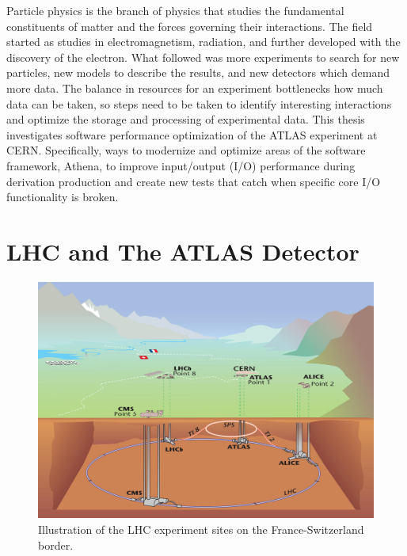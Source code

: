 Particle physics is the branch of physics that studies the fundamental constituents of matter and the forces governing their interactions.  
The field started as studies in electromagnetism, radiation, and further developed with the discovery of the electron.
What followed was more experiments to search for new particles, new models to describe the results, and new detectors which demand more data.
The balance in resources for an experiment bottlenecks how much data can be taken, so steps need to be taken to identify interesting interactions and optimize the storage and processing of experimental data.
This thesis investigates software performance optimization of the ATLAS experiment at CERN. 
Specifically, ways to modernize and optimize areas of the software framework, Athena, to improve input/output (I/O) performance during derivation production and create new tests that catch when specific core I/O functionality is broken.

\section{LHC and The ATLAS Detector}


\begin{figure}[h]
    \centering
    \vspace{20px}
    \includegraphics[width=.8\textwidth]{content/img/LHC illustration.jpg}
    \caption{Illustration of the LHC experiment sites on the France-Switzerland border.\cite{LHC_Illustration}}
    \vspace{20px}
    \label{fig:intro_LHC_sites}
\end{figure}

